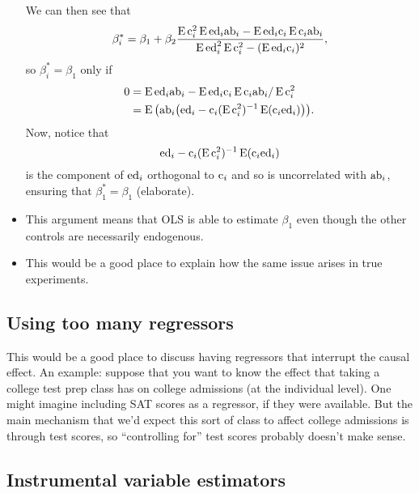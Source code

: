 \begin{itemize}[leftmargin=0pt]
  We can then see that
  \begin{equation*}
    \beta_i^* = \beta_1 + \beta_2 
    \frac{\E \co_i^2 \E \ed_i \ab_i - \E\ed_i \co_i \E \co_i \ab_i}%
    {\E \ed_i^2 \E \co_i^2 - (\E \ed_i \co_i)^2},
  \end{equation*}
  so $\beta_i^* = \beta_1$ only if
  \begin{align*}
    0
    &= \operatorname{E} \text{ed}_i \text{ab}_i - \operatorname{E}\text{ed}_i \text{c}_i \operatorname{E} \text{c}_i \text{ab}_i / \operatorname{E} \text{c}_i^2 \\
    &= \operatorname{E}\big( \text{ab}_i \big(\text{ed}_i - \text{c}_i (\operatorname{E} \text{c}_i^2)^{-1}\operatorname{E}(\text{c}_i
    \text{ed}_i) \big) \big).
  \end{align*}
  Now, notice that
  \begin{equation*}
    \text{ed}_i - \text{c}_i (\operatorname{E} \text{c}_i^2)^{-1}\operatorname{E}(\text{c}_i \text{ed}_i)
  \end{equation*}
  is the component of $\text{ed}_i$ orthogonal to $\text{c}_i$ and so is
  uncorrelated with $\text{ab}_i$, ensuring that $\beta_1^* = \beta_1$
  (elaborate).

\item This argument means that OLS is able to estimate $\beta_1$ even
  though the other controls are necessarily endogenous.

\item This would be a good place to explain how the same issue arises
  in true experiments.

\end{itemize}

\subsection{Using too many regressors}

This would be a good place to discuss having regressors that interrupt
the causal effect. An example: suppose that you want to know the
effect that taking a college test prep class has on college admissions
(at the individual level). One might imagine including SAT scores as a
regressor, if they were available. But the main mechanism that we'd
expect this sort of class to affect college admissions is through test
scores, so ``controlling for'' test scores probably doesn't make sense.

\subsection{Instrumental variable estimators}

